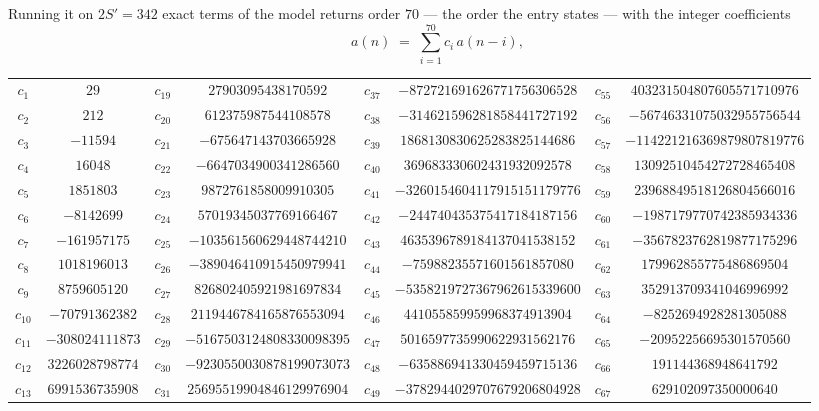 \documentclass[11pt,a4paper]{article}
\theoremstyle{plain}
\theoremstyle{definition}
\begin{document}
Running it on $2S'=342$ exact terms of the model returns order $70$ --- the order the
entry states --- with the integer coefficients
\[
a(n)\;=\;\sum_{i=1}^{70}c_i\,a(n-i),
\]
\begin{center}\small
\begin{tabular}{cccccccc}
$c_{1}$ & $29$ & $c_{19}$ & $27903095438170592$ & $c_{37}$ & $-872721691626771756306528$ & $c_{55}$ & $403231504807605571710976$ \\
$c_{2}$ & $212$ & $c_{20}$ & $612375987544108578$ & $c_{38}$ & $-314621596281858441727192$ & $c_{56}$ & $-56746331075032955756544$ \\
$c_{3}$ & $-11594$ & $c_{21}$ & $-675647143703665928$ & $c_{39}$ & $1868130830625283825144686$ & $c_{57}$ & $-114221216369879807819776$ \\
$c_{4}$ & $16048$ & $c_{22}$ & $-6647034900341286560$ & $c_{40}$ & $369683330602431932092578$ & $c_{58}$ & $13092510454272728465408$ \\
$c_{5}$ & $1851803$ & $c_{23}$ & $9872761858009910305$ & $c_{41}$ & $-3260154604117915151179776$ & $c_{59}$ & $23968849518126804566016$ \\
$c_{6}$ & $-8142699$ & $c_{24}$ & $57019345037769166467$ & $c_{42}$ & $-244740435375417184187156$ & $c_{60}$ & $-1987179770742385934336$ \\
$c_{7}$ & $-161957175$ & $c_{25}$ & $-103561560629448744210$ & $c_{43}$ & $4635396789184137041538152$ & $c_{61}$ & $-3567823762819877175296$ \\
$c_{8}$ & $1018196013$ & $c_{26}$ & $-389046410915450979941$ & $c_{44}$ & $-75988235571601561857080$ & $c_{62}$ & $179962855775486869504$ \\
$c_{9}$ & $8759605120$ & $c_{27}$ & $826802405921981697834$ & $c_{45}$ & $-5358219727367962615339600$ & $c_{63}$ & $352913709341046996992$ \\
$c_{10}$ & $-70791362382$ & $c_{28}$ & $2119446784165876553094$ & $c_{46}$ & $441055859959968374913904$ & $c_{64}$ & $-8252694928281305088$ \\
$c_{11}$ & $-308024111873$ & $c_{29}$ & $-5167503124808330098395$ & $c_{47}$ & $5016597735990622931562176$ & $c_{65}$ & $-20952256695301570560$ \\
$c_{12}$ & $3226028798774$ & $c_{30}$ & $-9230550030878199073073$ & $c_{48}$ & $-635886941330459459715136$ & $c_{66}$ & $191144368948641792$ \\
$c_{13}$ & $6991536735908$ & $c_{31}$ & $25695519904846129976904$ & $c_{49}$ & $-3782944029707679206804928$ & $c_{67}$ & $629102097350000640$ \\

\end{tabular}
\end{center}
\end{document}
